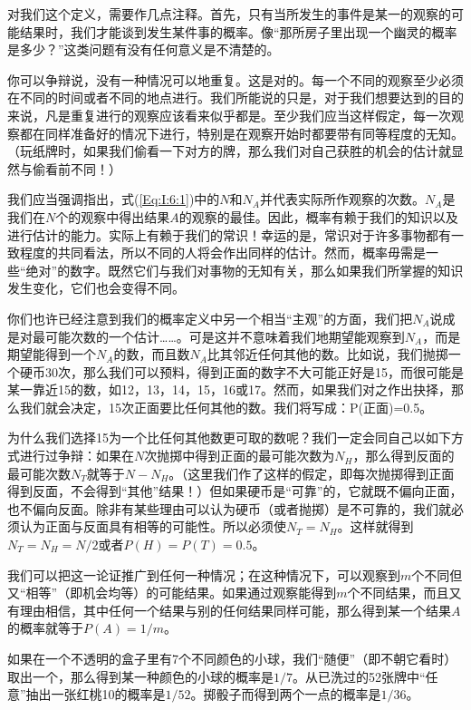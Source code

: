 对我们这个定义，需要作几点注释。首先，只有当所发生的事件是某一的观察的可能结果时，我们才能谈到发生某件事的概率。像“那所房子里出现一个幽灵的概率是多少？”这类问题有没有任何意义是不清楚的。

你可以争辩说，没有一种情况可以地重复。这是对的。每一个不同的观察至少必须在不同的时间或者不同的地点进行。我们所能说的只是，对于我们想要达到的目的来说，凡是重复进行的观察应该看来似乎都是。至少我们应当这样假定，每一次观察都在同样准备好的情况下进行，特别是在观察开始时都要带有同等程度的无知。（玩纸牌时，如果我们偷看一下对方的牌，那么我们对自己获胜的机会的估计就显然与偷看前不同！）

我们应当强调指出，式(\ref{Eq:I:6:1})中的$N$和$N_A$并代表实际所作观察的次数。$N_A$是我们在$N$个的观察中得出结果$A$的观察的最佳。因此，概率有赖于我们的知识以及进行估计的能力。实际上有赖于我们的常识！幸运的是，常识对于许多事物都有一致程度的共同看法，所以不同的人将会作出同样的估计。然而，概率毋需是一些“绝对”的数字。既然它们与我们对事物的无知有关，那么如果我们所掌握的知识发生变化，它们也会变得不同。

你们也许已经注意到我们的概率定义中另一个相当“主观”的方面，我们把$N_A$说成是对最可能次数的一个估计……。可是这并不意味着我们地期望能观察到$N_A$，而是期望能得到一个$N_A$的数，而且数$N_A$比其邻近任何其他的数。比如说，我们抛掷一个硬币$30$次，那么我们可以预料，得到正面的数字不大可能正好是15，而很可能是某一靠近15的数，如12，13，14，15，16或17。然而，如果我们对之作出抉择，那么我们就会决定，15次正面要比任何其他的数。我们将写成：P(正面)=0.5。

为什么我们选择15为一个比任何其他数更可取的数呢？我们一定会同自己以如下方式进行过争辩：如果在$N$次抛掷中得到正面的最可能次数为$N_H$，那么得到反面的最可能次数$N_T$就等于$N-N_H$。（这里我们作了这样的假定，即每次抛掷得到正面得到反面，不会得到“其他”结果！）但如果硬币是“可靠”的，它就既不偏向正面，也不偏向反面。除非有某些理由可以认为硬币（或者抛掷）是不可靠的，我们就必须认为正面与反面具有相等的可能性。所以必须使$N_T=N_H$。这样就得到$N_T=N_H=N/2$或者$P(H)=P(T)=0.5$。

我们可以把这一论证推广到任何一种情况；在这种情况下，可以观察到$m$个不同但又“相等”（即机会均等）的可能结果。如果通过观察能得到$m$个不同结果，而且又有理由相信，其中任何一个结果与别的任何结果同样可能，那么得到某一个结果$A$的概率就等于$P(A)=1/m$。

如果在一个不透明的盒子里有7个不同颜色的小球，我们“随便”（即不朝它看时）取出一个，那么得到某一种颜色的小球的概率是$1/7$。从已洗过的52张牌中“任意”抽出一张红桃10的概率是$1/52$。掷骰子而得到两个一点的概率是$1/36$。
\begin{center}
\makebox[200pt]{\hrulefill}
\end{center}


